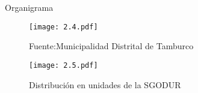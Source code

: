 \begin{frame}{Organigrama }
    \begin{minipage}{0.45\textwidth}
        \begin{figure}[H]
            \centering
            \texttt{[image: 2.4.pdf]}
            \caption[Organigrama de la Municipalidad Distrital de Tamburco]{Fuente:Municipalidad Distrital de Tamburco}
            \label{fig:organigrama-tamburco}
        \end{figure}
    \end{minipage}
    \quad
    \begin{minipage}{0.45\textwidth}
        \begin{figure}[H]
            \captionsetup{width=0.8\textwidth}
            \centering
            \texttt{[image: 2.5.pdf]}
            \caption{Distribución en unidades de la SGODUR}
            \label{fig:2.5}
        \end{figure}
    \end{minipage}
\end{frame}